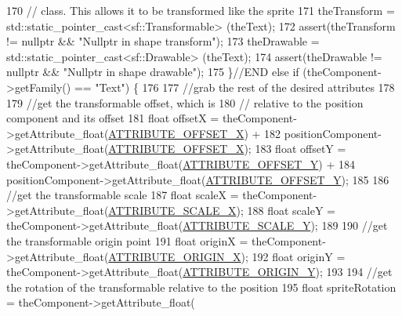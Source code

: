 \begin{DoxyCode}
170                 \textcolor{comment}{//  class. This allows it to be transformed like the sprite}
171                 theTransform = std::static\_pointer\_cast<sf::Transformable> (theText);
172                 assert(theTransform != \textcolor{keyword}{nullptr} && \textcolor{stringliteral}{"Nullptr in shape transform"});
173                 theDrawable = std::static\_pointer\_cast<sf::Drawable> (theText);
174                 assert(theDrawable != \textcolor{keyword}{nullptr} && \textcolor{stringliteral}{"Nullptr in shape drawable"});
175             \}\textcolor{comment}{//END else if (theComponent->getFamily() == "Text") \{}
176 
177             \textcolor{comment}{//grab the rest of the desired attributes}
178 
179             \textcolor{comment}{//get the transformable offset, which is }
180             \textcolor{comment}{//  relative to the position component and its offset}
181             \textcolor{keywordtype}{float} offsetX = theComponent->getAttribute\_float(\hyperlink{_a_e___attributes_8h_aa003b6ad3f43053c9d43e1acc0098691}{ATTRIBUTE\_OFFSET\_X}) +
182                 positionComponent->getAttribute\_float(\hyperlink{_a_e___attributes_8h_aa003b6ad3f43053c9d43e1acc0098691}{ATTRIBUTE\_OFFSET\_X});
183             \textcolor{keywordtype}{float} offsetY = theComponent->getAttribute\_float(\hyperlink{_a_e___attributes_8h_a8ebf91b8ee9dfdfad18bc10c3c42d564}{ATTRIBUTE\_OFFSET\_Y}) + 
184                 positionComponent->getAttribute\_float(\hyperlink{_a_e___attributes_8h_a8ebf91b8ee9dfdfad18bc10c3c42d564}{ATTRIBUTE\_OFFSET\_Y});
185 
186             \textcolor{comment}{//get the transformable scale}
187             \textcolor{keywordtype}{float} scaleX = theComponent->getAttribute\_float(\hyperlink{_a_e___attributes_8h_a8104e81b9e1e7fd7e21f1f5f850ca636}{ATTRIBUTE\_SCALE\_X});
188             \textcolor{keywordtype}{float} scaleY = theComponent->getAttribute\_float(\hyperlink{_a_e___attributes_8h_aa800ca9799c1b216f086becf36509ea5}{ATTRIBUTE\_SCALE\_Y});
189 
190             \textcolor{comment}{//get the transformable origin point}
191             \textcolor{keywordtype}{float} originX = theComponent->getAttribute\_float(\hyperlink{_a_e___attributes_8h_a5c5a5ae3ea4130db3dfd08029a17a17c}{ATTRIBUTE\_ORIGIN\_X});
192             \textcolor{keywordtype}{float} originY = theComponent->getAttribute\_float(\hyperlink{_a_e___attributes_8h_af45315d7cdc2f4ecdb28d0a9d6bb15c7}{ATTRIBUTE\_ORIGIN\_Y});
193 
194             \textcolor{comment}{//get the rotation of the transformable relative to the position}
195             \textcolor{keywordtype}{float} spriteRotation = theComponent->getAttribute\_float(

\end{DoxyCode}

